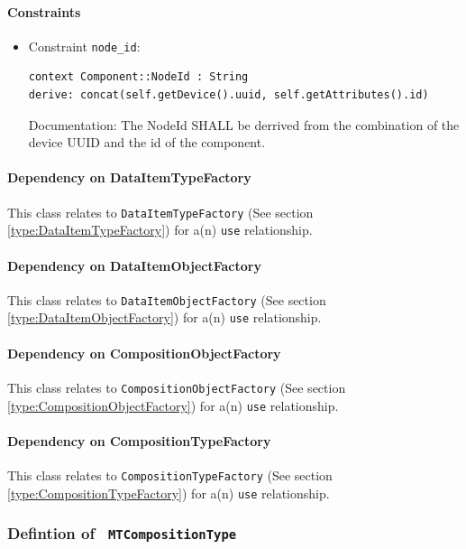\paragraph{Constraints}
\begin{itemize}
\item Constraint \texttt{node_id}: 
   \indent \begin{Verbatim}[xleftmargin=.25in,fontsize=\small]
context Component::NodeId : String 
derive: concat(self.getDevice().uuid, self.getAttributes().id)
\end{Verbatim}
Documentation: The NodeId SHALL be derrived from the combination of the device UUID and the id of the component. 

\end{itemize}
\paragraph{Dependency on DataItemTypeFactory}

This class relates to \texttt{DataItemTypeFactory} (See section \ref{type:DataItemTypeFactory}) for a(n) \texttt{use} relationship.

\paragraph{Dependency on DataItemObjectFactory}

This class relates to \texttt{DataItemObjectFactory} (See section \ref{type:DataItemObjectFactory}) for a(n) \texttt{use} relationship.

\paragraph{Dependency on CompositionObjectFactory}

This class relates to \texttt{CompositionObjectFactory} (See section \ref{type:CompositionObjectFactory}) for a(n) \texttt{use} relationship.

\paragraph{Dependency on CompositionTypeFactory}

This class relates to \texttt{CompositionTypeFactory} (See section \ref{type:CompositionTypeFactory}) for a(n) \texttt{use} relationship.

\FloatBarrier
\subsubsection{Defintion of \texttt{ MTCompositionType}} \label{type:MTCompositionType}

